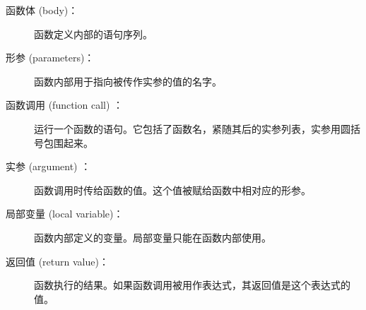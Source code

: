 \begin{description}

\item[函数体 (body)：] 函数定义内部的语句序列。
  


\item[形参 (parameters)：] 函数内部用于指向被传作实参的值的名字。
  


\item[函数调用 (function call) ：] 运行一个函数的语句。它包括了函数名，紧随其后的实参列表，实参用圆括号包围起来。
  


\item[实参 (argument) ：] 函数调用时传给函数的值。这个值被赋给函数中相对应的形参。
  


\item[局部变量 (local variable)：] 函数内部定义的变量。局部变量只能在函数内部使用。
  


\item[返回值 (return value)：] 函数执行的结果。如果函数调用被用作表达式，其返回值是这个表达式的值。
  



\end{description}
